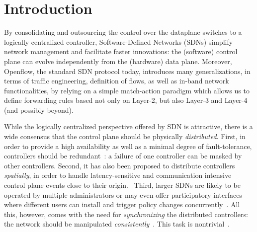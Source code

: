 \documentclass[conference]{sigcomm-alternate}
\begin{document}



\section{Introduction}\label{sec:intro}

By consolidating and outsourcing the control over the dataplane switches to a logically
centralized controller, Software-Defined Networks (SDNs)
simplify network management and facilitate faster innovations:
the (software) control plane can evolve independently from the
(hardware) data plane.
Moreover, Openflow, the standard SDN protocol today, introduces many generalizations,
in terms of traffic engineering, definition of flows, as well as in-band network functionalities,
by relying on a simple match-action paradigm which allows us to define
forwarding rules based not only on Layer-2, but also Layer-3 and Layer-4 (and possibly beyond).

While the logically centralized perspective offered by SDN is attractive,
there is a wide consensus that
the control plane should be physically \emph{distributed}.
First, in order to provide a high availability as well as a minimal degree of
fault-tolerance, controllers should be redundant~\cite{onix,stn,onos}: a failure
of one controller can be masked by other controllers. Second, it has also been proposed
to distribute controllers \emph{spatially}, in order to handle latency-sensitive and
communication intensive control plane events close to their origin.~\cite{devoflow,kandoo,jukka,disco}
Third, larger SDNs are likely to be operated by multiple administrators or may even offer
participatory interfaces where different users can install and trigger policy changes
concurrently~\cite{participatory,stn}.
All this, however, comes with the need for \emph{synchronizing}
the distributed controllers:
the network should be manipulated \emph{consistently}~\cite{cpc}.
This task is nontrivial~\cite{cap-theorem}.

\end{document}
